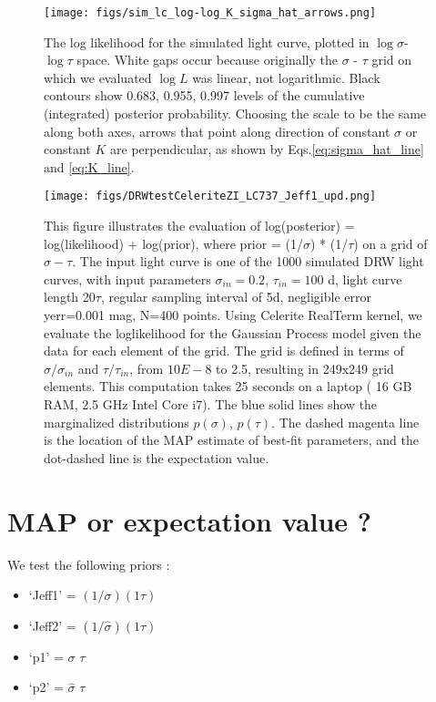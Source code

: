 \documentclass[fleqn,usenatbib]{mnras}  %
\begin{document}
\begin{figure}
\texttt{[image: figs/sim\_lc\_log-log\_K\_sigma\_hat\_arrows.png]}
\caption{The log likelihood for the simulated light curve, plotted in  $\log{\sigma}$-$\log{\tau}$ space.  White gaps occur because originally the   $\sigma$ - $\tau$ grid on which we evaluated $\log{L}$ was linear, not logarithmic.  Black contours show 0.683, 0.955, 0.997 levels of the cumulative (integrated) posterior probability. Choosing the scale to be the same along both axes,  arrows that point along direction of constant $\hat{\sigma}$ or constant $K$ are perpendicular, as shown by Eqs.\ref{eq:sigma_hat_line} and \ref{eq:K_line}. }
\label{fig:lc_logL_arrows}
\end{figure} 

\begin{figure}
\texttt{[image: figs/DRWtestCeleriteZI\_LC737\_Jeff1\_upd.png]}
\caption{This figure illustrates the evaluation of log(posterior) = log(likelihood) + log(prior), where prior = (1/$\sigma$) * (1/$\tau$) on a grid of $\sigma-\tau$. The input light curve is one of the 1000 simulated DRW light curves, with input parameters $\sigma_{in}=0.2$, $\tau_{in}=100$ d, light curve length 20$\tau$, regular sampling interval of 5d, negligible error yerr=0.001  mag, N=400  points. Using Celerite RealTerm kernel, we evaluate the loglikelihood for the Gaussian Process model given the data for each element of the grid. The grid is defined in terms of $\sigma/\sigma_{in}$ and $\tau/ \tau_{in}$, from $10E-8$ to 2.5, resulting in 249x249 grid elements. This computation takes 25 seconds on a laptop ( 16 GB RAM, 2.5 GHz Intel Core i7). The blue solid lines show the marginalized distributions $p(\sigma)$, $p(\tau)$. The dashed magenta line is the location of the MAP estimate of best-fit parameters, and the dot-dashed line is the expectation value. }
\label{fig:lc_logL_exp_MAF}
\end{figure} 



\section{MAP or expectation value ? }

We test the following priors : 


\begin{itemize}
	\item `Jeff1' = $(1/\sigma)(1\tau)$
	\item `Jeff2' = $(1/\hat{\sigma})(1\tau)$
	\item `p1' = $\sigma$  $\tau$
	\item `p2' =  $\hat{\sigma}$  $\tau$
\end{itemize}
\end{document}
